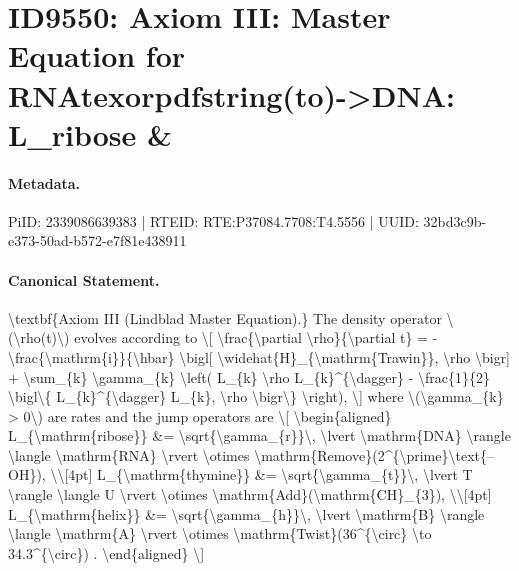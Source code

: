 \section*{ID9550: Axiom III: Master Equation for RNAtexorpdfstring(to)->DNA: L\_ribose \&}
\paragraph{Metadata.}
PiID: 2339086639383 | RTEID: RTE:P37084.7708:T4.5556 | UUID: 32bd3c9b-e373-50ad-b572-e7f81e438911

\paragraph{Canonical Statement.}
\textbackslash{}textbf\{Axiom III (Lindblad Master Equation).\} The density operator \textbackslash{}(\textbackslash{}rho(t)\textbackslash{}) evolves according to \textbackslash{}[ \textbackslash{}frac\{\textbackslash{}partial \textbackslash{}rho\}\{\textbackslash{}partial t\} = - \textbackslash{}frac\{\textbackslash{}mathrm\{i\}\}\{\textbackslash{}hbar\} \textbackslash{}bigl[ \textbackslash{}widehat\{H\}\_\{\textbackslash{}mathrm\{Trawin\}\}, \textbackslash{}rho \textbackslash{}bigr] + \textbackslash{}sum\_\{k\} \textbackslash{}gamma\_\{k\} \textbackslash{}left( L\_\{k\} \textbackslash{}rho L\_\{k\}\textasciicircum{}\{\textbackslash{}dagger\} - \textbackslash{}frac\{1\}\{2\} \textbackslash{}bigl\textbackslash{}\{ L\_\{k\}\textasciicircum{}\{\textbackslash{}dagger\} L\_\{k\}, \textbackslash{}rho \textbackslash{}bigr\textbackslash{}\} \textbackslash{}right), \textbackslash{}] where \textbackslash{}(\textbackslash{}gamma\_\{k\} > 0\textbackslash{}) are rates and the jump operators are \textbackslash{}[ \textbackslash{}begin\{aligned\} L\_\{\textbackslash{}mathrm\{ribose\}\} \&= \textbackslash{}sqrt\{\textbackslash{}gamma\_\{r\}\}\textbackslash{}, \textbackslash{}lvert \textbackslash{}mathrm\{DNA\} \textbackslash{}rangle \textbackslash{}langle \textbackslash{}mathrm\{RNA\} \textbackslash{}rvert \textbackslash{}otimes \textbackslash{}mathrm\{Remove\}(2\textasciicircum{}\{\textbackslash{}prime\}\textbackslash{}text\{--OH\}), \textbackslash{}\textbackslash{}[4pt] L\_\{\textbackslash{}mathrm\{thymine\}\} \&= \textbackslash{}sqrt\{\textbackslash{}gamma\_\{t\}\}\textbackslash{}, \textbackslash{}lvert T \textbackslash{}rangle \textbackslash{}langle U \textbackslash{}rvert \textbackslash{}otimes \textbackslash{}mathrm\{Add\}(\textbackslash{}mathrm\{CH\}\_\{3\}), \textbackslash{}\textbackslash{}[4pt] L\_\{\textbackslash{}mathrm\{helix\}\} \&= \textbackslash{}sqrt\{\textbackslash{}gamma\_\{h\}\}\textbackslash{}, \textbackslash{}lvert \textbackslash{}mathrm\{B\} \textbackslash{}rangle \textbackslash{}langle \textbackslash{}mathrm\{A\} \textbackslash{}rvert \textbackslash{}otimes \textbackslash{}mathrm\{Twist\}(36\textasciicircum{}\{\textbackslash{}circ\} \textbackslash{}to 34.3\textasciicircum{}\{\textbackslash{}circ\}) . \textbackslash{}end\{aligned\} \textbackslash{}]

